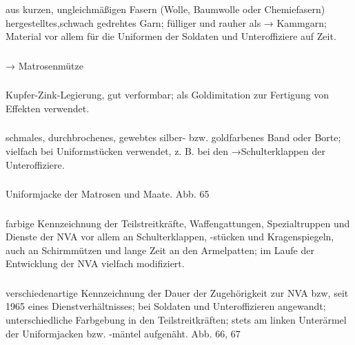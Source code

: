 aus kurzen, ungleichmäßigen Fasern (Wolle, Baumwolle
oder Chemiefasern) hergestelltes,schwach gedrehtes
Garn; fülliger und rauher als → Kammgarn; Material vor
allem für die Uniformen der Soldaten und Unteroffiziere
auf Zeit.

\subsubsection*{}%

→ Matrosenmütze

\subsubsection*{}%

Kupfer-Zink-Legierung, gut verformbar; als Goldimitation zur Fertigung von Effekten verwendet.

\subsubsection*{}%

schmales, durchbrochenes, gewebtes silber- bzw. goldfarbenes Band oder Borte; vielfach bei Uniformstücken verwendet, z. B. bei den →Schulterklappen der Unteroffiziere.

\subsubsection*{}%

Uniformjacke der Matrosen und Maate. Abb. 65

\subsubsection*{}%

farbige Kennzeichnung der Teilstreitkräfte, Waffengattungen, Spezialtruppen und Dienste der NVA vor allem an Schulterklappen, -stücken und Kragenspiegeln, auch an Schirmmützen und lange Zeit an den Armelpatten; im Laufe der Entwicklung der NVA vielfach modifiziert.

\subsubsection*{}%

verschiedenartige Kennzeichnung der Dauer der Zugehörigkeit zur NVA bzw, seit 1965 eines Dienstverhältnisses; bei Soldaten und Unteroffizieren angewandt; unterschiedliche Farbgebung in den Teilstreitkräften; stets am linken Unterärmel der Uniformjacken bzw. -mäntel aufgenäht. Abb. 66, 67

